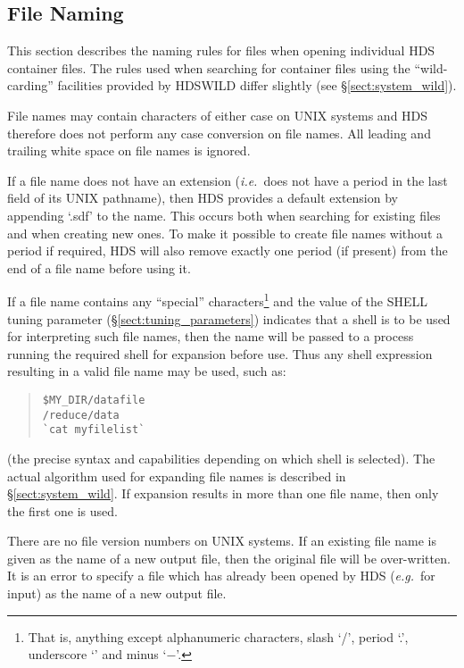 \documentclass[twoside,11pt]{article}
\newcommand{\htmlref}[2]{#1}
\newcommand{\xlabel}[1]{}
\renewcommand{\_}{\texttt{\symbol{95}}}
\newcommand{\qt}[1]{``#1''}
\newcommand{\st}[1]{{\em{#1}}}
\newcommand{\qt}[1]{{\tt{"}}#1{\tt{"}}}
\begin{document}
\subsection{\xlabel{file_naming}\label{sect:system_files}File Naming}

This section describes the naming rules for files when opening
individual HDS container files. The rules used when searching for
container files using the \qt{wild-carding} facilities provided by
\htmlref{HDS\_WILD}{HDS_WILD} differ slightly (see \S\ref{sect:system_wild}).

File names may contain characters of either case on UNIX systems and
HDS therefore does not perform any case conversion on file names. All
leading and trailing white space on file names is ignored.

If a file name does not have an extension (\st{i.e.}\ does not have a
period in the last field of its UNIX pathname), then HDS provides a
default extension by appending `.sdf' to the name. This occurs both
when searching for existing files and when creating new ones. To make
it possible to create file names without a period if required, HDS
will also remove exactly one period (if present) from the end of a
file name before using it.

If a file name contains any \qt{special} characters\footnote{That is,
anything except alphanumeric characters, slash `/', period `.',
underscore `\_' and minus `$-$'.} and the value of the SHELL tuning
parameter (\S\ref{sect:tuning_parameters}) indicates that a shell is
to be used for interpreting such file names, then the name will be
passed to a process running the required shell for expansion before
use. Thus any shell expression resulting in a valid file name may be
used, such as:

\small
\begin{quote}
\begin{verbatim}
$MY_DIR/datafile
/reduce/data
`cat myfilelist`
\end{verbatim}
\end{quote}
\normalsize

(the precise syntax and capabilities depending on which shell is
selected). The actual algorithm used for expanding file names is
described in \S\ref{sect:system_wild}. If expansion results in more
than one file name, then only the first one is used.

There are no file version numbers on UNIX systems. If an existing file
name is given as the name of a new output file, then the original file
will be over-written. It is an error to specify a file which has
already been opened by HDS (\st{e.g.}\ for input) as the name of a
new output file.
\end{document}
